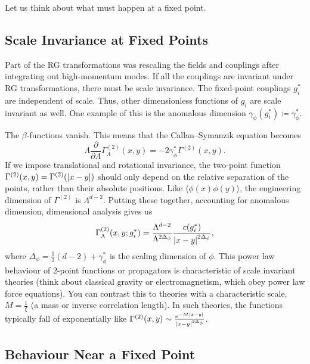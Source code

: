 Let us think about what must happen at a fixed point.

\subsection*{Scale Invariance at Fixed Points}%

Part of the RG transformations was rescaling the fields and couplings after integrating out high-momentum modes. If all the couplings are invariant under RG transformations, there must be scale invariance.
The fixed-point couplings $g_i^*$ are independent of scale. 
Thus, other dimensionless functions of $g_i$ are scale invariant as well. One example of this is the anomalous dimension $\gamma_\phi (g_i^*) \coloneqq \gamma_\phi^*$.

The $\beta$-functions vanish. This means that the Callan--Symanzik equation becomes
\begin{equation}
  \Lambda \frac{\partial }{\partial \Lambda} \Gamma^{(2)}_{\Lambda} (x, y) = - 2 \gamma_\phi^* \Gamma^{(2)} (x, y).
\end{equation}
If we impose translational and rotational invariance, the two-point function $\Gamma^{(2)}(x, y) = \Gamma^{(2)} (\abs{x - y})$ should only depend on the relative separation of the points, rather than their absolute positions.
Like $\langle \phi(x) \phi(y) \rangle$, the engineering dimension of $\Gamma^{(2)}$ is $\Lambda^{d-2}$.
Putting these together, accounting for anomalous dimension, dimensional analysis gives us
\begin{equation}
  \Gamma^{(2)}_{\Lambda}(x, y; g^*_i) = \frac{\Lambda^{d - 2}}{\Lambda^{2 \Delta_\phi}} \frac{c(g_i^*)}{\abs{x - y}^{2 \Delta_\phi}},
\end{equation}
where $\Delta_\phi = \frac{1}{2} (d - 2) + \gamma_{\phi}^*$ is the scaling dimension of $\phi$.
This power law behaviour of $2$-point functions or propagators is characteristic of scale invariant theories (think about classical gravity or electromagnetism, which obey power law force equations).
You can contrast this to theories with a characteristic scale, $M = \frac{1}{\xi}$ (a mass or inverse correlation length).
In such theories, the functions typically fall of exponentially like $\Gamma^{(2)}(x, y) \sim \frac{e^{-M \abs{x - y}}}{\abs{x - y}^{2 \Delta_\phi}}$.

\subsection*{Behaviour Near a Fixed Point}%

